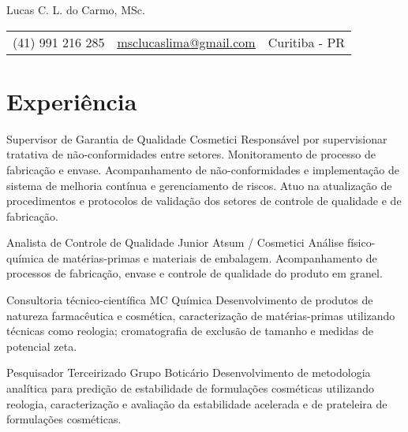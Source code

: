 \pagestyle{fancy} %
\fancyhf{} 
\renewcommand{\headrulewidth}{0pt}


\thispagestyle{empty}

\begin{center}
	
	{\LARGE Lucas C. L. do Carmo, MSc.}
	
	\vspace{6pt}
	\begin{tabular}{c|c|c}
		(41) 991 216 285 & \textcolor{Accent}{\underline{\href{mailto:msclucaslima@gmail.com}{msclucaslima@gmail.com}}} & Curitiba - PR
	\end{tabular}

	\vspace{6pt}
	
\end{center}
	

\section{Experiência}

{Supervisor de Garantia de Qualidade}
{Cosmetici}
{
	Responsável por supervisionar tratativa de não-conformidades entre setores.
	Monitoramento de processo de fabricação e envase.
	Acompanhamento de não-conformidades e implementação de
	sistema de melhoria contínua e gerenciamento de riscos.
	Atuo na atualização de procedimentos e protocolos de validação dos setores
	de controle de qualidade e de fabricação.
}

{Analista de Controle de Qualidade Junior}
{Atsum / Cosmetici}
{
	Análise físico-química de matérias-primas e materiais de embalagem.
	Acompanhamento de processos de fabricação, envase e controle de qualidade do
	produto em granel.
}

{Consultoria técnico-científica}
{MC Química}
{
	Desenvolvimento de produtos de natureza farmacêutica e cosmética, 
	caracterização de matérias-primas utilizando técnicas como reologia;
	cromatografia de exclusão de tamanho e medidas de potencial zeta.
}

{Pesquisador Terceirizado}
{Grupo Boticário}
{
	Desenvolvimento de metodologia analítica para predição de estabilidade
	de formulações cosméticas utilizando reologia,
	caracterização e avaliação da estabilidade acelerada e de prateleira
	de formulações cosméticas.
}

